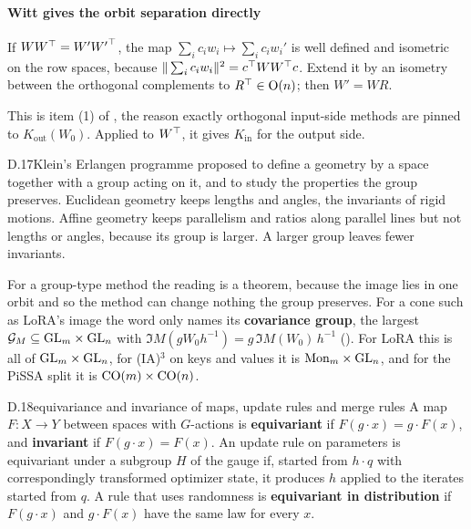 \paragraph{Witt gives the orbit separation directly}
If $WW^{\top}=W'{W'}^{\top}$, the map $\sum_ic_iw_i\mapsto\sum_ic_iw_i'$ is well defined and isometric on the row spaces, because
$\|\sum_ic_iw_i\|^2=c^{\top} WW^{\top} c$. Extend it by an isometry between the orthogonal complements to $R^{\top}\in\mathrm{O}(n)$; then
$W'=WR$.

This is item (1) of , the reason exactly orthogonal input-side methods are pinned to
$K_{\mathrm{out}}(W_0)$. Applied to $W^{\top}$, it gives $K_{\mathrm{in}}$ for the output side.


\begin{bgentry}{D.17}{Klein's Erlangen programme}
\citet{xklein1872vergleichende} proposed to define a geometry by a space together with a group acting on it, and to
study the properties the group preserves. Euclidean geometry keeps lengths and angles, the invariants of rigid motions.
Affine geometry keeps parallelism and ratios along parallel lines but not lengths or angles, because its group is
larger. A larger group leaves fewer invariants.
\end{bgentry}

For a group-type method the reading is a theorem, because the image lies in one orbit and so the method can change
nothing the group preserves. For a cone such as LoRA's image the word only names its \textbf{covariance group}, the
largest $\mathcal G_M\subseteq\mathrm{GL}_m\times\mathrm{GL}_n$ with $\Im M(gW_0h^{-1})=g\,\Im M(W_0)\,h^{-1}$ (). For LoRA
this is all of $\mathrm{GL}_m\times\mathrm{GL}_n$, for (IA)$^3$ on keys and values it is $\mathrm{Mon}_m\times\mathrm{GL}_n$, and for the PiSSA
split it is $\mathrm{CO}(m)\times\mathrm{CO}(n)$.


\begin{bgentry}{D.18}{equivariance and invariance of maps, update rules and merge rules}
A map $F:X\to Y$ between spaces with $G$-actions is \textbf{equivariant} if $F(g\cdot x)=g\cdot F(x)$, and
\textbf{invariant} if $F(g\cdot x)=F(x)$. An update rule on parameters is equivariant under a subgroup $H$ of the gauge
if, started from $h\cdot q$ with correspondingly transformed optimizer state, it produces $h$ applied to the iterates
started from $q$. A rule that uses randomness is \textbf{equivariant in distribution} if $F(g\cdot x)$ and $g\cdot F(x)$
have the same law for every $x$.
\end{bgentry}

